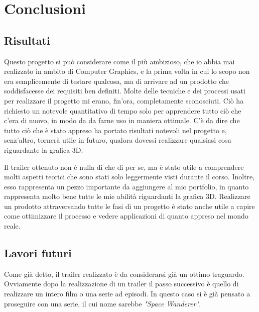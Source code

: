 
\chapter{Conclusioni} %

\label{Chapter6} %


\section{Risultati}
Questo progetto si può considerare come il più ambizioso, che io abbia mai realizzato in ambito di Computer Graphics, e la prima volta in cui lo scopo non era semplicemente di testare qualcosa, ma di arrivare ad un prodotto che soddisfacesse dei requisiti ben definiti.
Molte delle tecniche e dei processi usati per realizzare il progetto mi erano, fin'ora, completamente sconosciuti.
Ciò ha richiesto un notevole quantitativo di tempo solo per apprendere tutto ciò che c'era di nuovo, in modo da da farne uso in maniera ottimale.
C'è da dire che tutto ciò che è stato appreso ha portato risultati notevoli nel progetto e, senz'altro, tornerà utile in futuro, qualora dovessi realizzare qualsiasi cosa riguardante la grafica 3D.

Il trailer ottenuto non è nulla di che di per se, ma è stato utile a comprendere molti aspetti teorici che sono stati solo leggermente visti durante il corso.
Inoltre, esso rappresenta un pezzo importante da aggiungere al mio portfolio, in quanto rappresenta molto bene tutte le mie abilità riguardanti la grafica 3D.
Realizzare un prodotto attraversando tutte le fasi di un progetto è stato anche utile a capire come ottimizzare il processo e vedere applicazioni di quanto appreso nel mondo reale.

\section{Lavori futuri}

Come già detto, il trailer realizzato è da considerarsi già un ottimo traguardo. Ovviamente dopo la realizzazione di un trailer il passo successivo è quello di realizzare un intero film o una serie ad episodi.
In questo caso si è già pensato a proseguire con una serie, il cui nome sarebbe \emph{"Space Wanderer"}.

